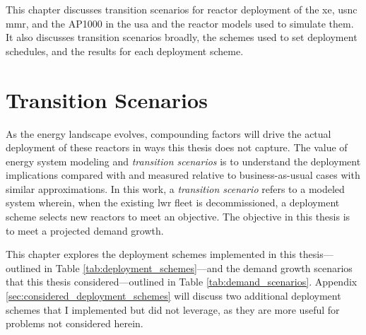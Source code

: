 This chapter discusses transition scenarios for reactor deployment of the \gls{xe}, \gls{usnc} \gls{mmr}, and the AP1000 in the \gls{usa} and the reactor models used to simulate them. It also discusses transition scenarios broadly, the schemes used to set deployment schedules, and the results for each deployment scheme.

\section{Transition Scenarios}
\label{sec:transition_scenarios}

As the energy landscape evolves, compounding factors will drive the actual deployment of these reactors in ways this thesis does not capture. The value of energy system modeling and \textit{transition scenarios} is to understand the deployment implications compared with and measured relative to business-as-usual cases with similar approximations. In this work, a \textit{transition scenario} refers to a modeled system wherein, when the existing \gls{lwr} fleet is decommissioned, a deployment scheme selects new reactors to meet an objective. The objective in this thesis is to meet a projected demand growth.

This chapter explores the deployment schemes implemented in this thesis---outlined in Table \ref{tab:deployment_schemes}---and the demand growth scenarios that this thesis considered---outlined in Table \ref{tab:demand_scenarios}. Appendix \ref{sec:considered_deployment_schemes} will discuss two additional deployment schemes that I implemented but did not leverage, as they are more useful for problems not considered herein.

